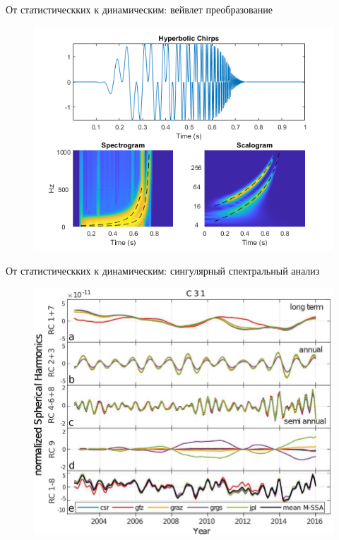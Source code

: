 \begin{frame}{От статистическких к динамическим: вейвлет преобразование}
	\begin{figure}
		\centering
		\includegraphics[width=0.8\linewidth]{lecture_1/figs/wavelet.png}
	\end{figure}
\end{frame}
\begin{frame}{От статистическких к динамическим: сингулярный спектральный анализ}
	\begin{figure}
		\centering
		\includegraphics[width=0.8\linewidth]{./figs/ssa.jpg}
	\end{figure}
\end{frame}
